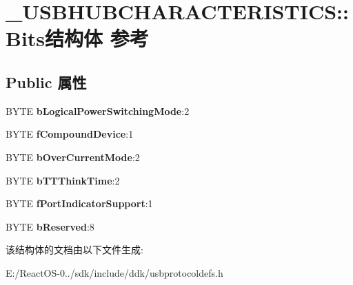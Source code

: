 \hypertarget{struct___u_s_b_h_u_b_c_h_a_r_a_c_t_e_r_i_s_t_i_c_s_1_1_bits}{}\section{\+\_\+\+U\+S\+B\+H\+U\+B\+C\+H\+A\+R\+A\+C\+T\+E\+R\+I\+S\+T\+I\+CS\+:\+:Bits结构体 参考}
\label{struct___u_s_b_h_u_b_c_h_a_r_a_c_t_e_r_i_s_t_i_c_s_1_1_bits}
\subsection*{Public 属性}
\begin{DoxyCompactItemize}
\item 
\mbox{\label{struct___u_s_b_h_u_b_c_h_a_r_a_c_t_e_r_i_s_t_i_c_s_1_1_bits_a69ddda89981a06a965d30edde183333f}} 
B\+Y\+TE {\bfseries b\+Logical\+Power\+Switching\+Mode}\+:2
\item 
\mbox{\label{struct___u_s_b_h_u_b_c_h_a_r_a_c_t_e_r_i_s_t_i_c_s_1_1_bits_ad338df1ddc5873e15b271bd840d0c67a}} 
B\+Y\+TE {\bfseries f\+Compound\+Device}\+:1
\item 
\mbox{\label{struct___u_s_b_h_u_b_c_h_a_r_a_c_t_e_r_i_s_t_i_c_s_1_1_bits_a4b8b559959605f16064d8121c78f3e3d}} 
B\+Y\+TE {\bfseries b\+Over\+Current\+Mode}\+:2
\item 
\mbox{\label{struct___u_s_b_h_u_b_c_h_a_r_a_c_t_e_r_i_s_t_i_c_s_1_1_bits_a50f82e03860cdffc70c70fe94ca6e9e2}} 
B\+Y\+TE {\bfseries b\+T\+T\+Think\+Time}\+:2
\item 
\mbox{\label{struct___u_s_b_h_u_b_c_h_a_r_a_c_t_e_r_i_s_t_i_c_s_1_1_bits_abe76401703cab6d33e1468a2fef0526b}} 
B\+Y\+TE {\bfseries f\+Port\+Indicator\+Support}\+:1
\item 
\mbox{\label{struct___u_s_b_h_u_b_c_h_a_r_a_c_t_e_r_i_s_t_i_c_s_1_1_bits_a65996e0849f68fc19acb66c237e1f137}} 
B\+Y\+TE {\bfseries b\+Reserved}\+:8
\end{DoxyCompactItemize}


该结构体的文档由以下文件生成\+:\begin{DoxyCompactItemize}
\item 
E\+:/\+React\+O\+S-\/0../sdk/include/ddk/usbprotocoldefs.\+h\end{DoxyCompactItemize}
